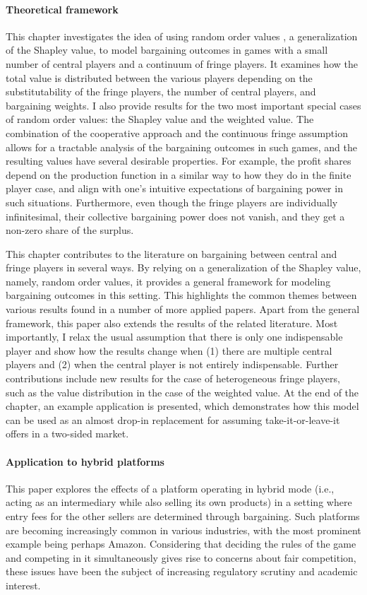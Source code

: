 \paragraph{Theoretical framework}
This chapter investigates the idea of using random order values \parencite{weber1988probabilistic}, a generalization of the Shapley value, to model bargaining outcomes in games with a small number of central players and a continuum of fringe players.
It examines how the total value is distributed between the various players depending on the substitutability of the fringe players, the number of central players, and bargaining weights.
I also provide results for the two most important special cases of random order values: the Shapley value and the weighted value.
The combination of the cooperative approach and the continuous fringe assumption allows for a tractable analysis of the bargaining outcomes in such games, and the resulting values have several desirable properties.
For example, the profit shares depend on the production function in a similar way to how they do in the finite player case, and align with one's intuitive expectations of bargaining power in such situations.
Furthermore, even though the fringe players are individually infinitesimal, their collective bargaining power does not vanish, and they get a non-zero share of the surplus.

This chapter contributes to the literature on bargaining between central and fringe players in several ways.
By relying on a generalization of the Shapley value, namely, random order values, it provides a general framework for modeling bargaining outcomes in this setting.
This highlights the common themes between various results found in a number of more applied papers.
Apart from the general framework, this paper also extends the results of the related literature.
Most importantly, I relax the usual assumption that there is only one indispensable player and show how the results change when (1) there are multiple central players and (2) when the central player is not entirely indispensable.
Further contributions include new results for the case of heterogeneous fringe players, such as the value distribution in the case of the weighted value.
At the end of the chapter, an example application is presented, which demonstrates how this model can be used as an almost drop-in replacement for assuming take-it-or-leave-it offers in a two-sided market.

\paragraph{Application to hybrid platforms}
This paper explores the effects of a platform operating in hybrid mode (i.e., acting as an intermediary while also selling its own products) in a setting where entry fees for the other sellers are determined through bargaining.
Such platforms are becoming increasingly common in various industries, with the most prominent example being perhaps Amazon.
Considering that deciding the rules of the game and competing in it simultaneously gives rise to concerns about fair competition, these issues have been the subject of increasing regulatory scrutiny and academic interest.

